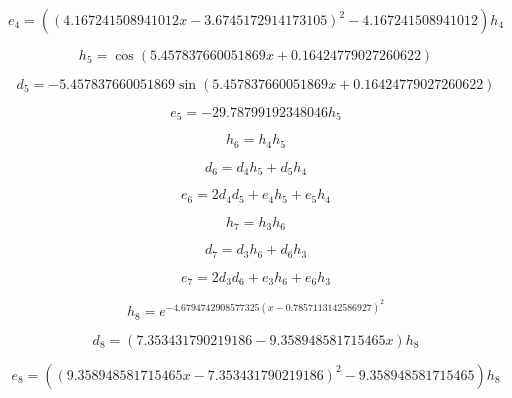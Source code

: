 \begin{equation}
e_{4}=\left(\left(4.167241508941012 x - 3.6745172914173105\right)^{2} - 4.167241508941012\right) h_{4}
\end{equation}


\begin{equation}
h_{5}=\cos{\left(5.457837660051869 x + 0.16424779027260622 \right)}
\end{equation}


\begin{equation}
d_{5}=- 5.457837660051869 \sin{\left(5.457837660051869 x + 0.16424779027260622 \right)}
\end{equation}


\begin{equation}
e_{5}=- 29.78799192348046 h_{5}
\end{equation}


\begin{equation}
h_{6}=h_{4} h_{5}
\end{equation}


\begin{equation}
d_{6}=d_{4} h_{5} + d_{5} h_{4}
\end{equation}


\begin{equation}
e_{6}=2 d_{4} d_{5} + e_{4} h_{5} + e_{5} h_{4}
\end{equation}


\begin{equation}
h_{7}=h_{3} h_{6}
\end{equation}


\begin{equation}
d_{7}=d_{3} h_{6} + d_{6} h_{3}
\end{equation}


\begin{equation}
e_{7}=2 d_{3} d_{6} + e_{3} h_{6} + e_{6} h_{3}
\end{equation}


\begin{equation}
h_{8}=e^{- 4.6794742908577325 \left(x - 0.7857113142586927\right)^{2}}
\end{equation}


\begin{equation}
d_{8}=\left(7.353431790219186 - 9.358948581715465 x\right) h_{8}
\end{equation}


\begin{equation}
e_{8}=\left(\left(9.358948581715465 x - 7.353431790219186\right)^{2} - 9.358948581715465\right) h_{8}
\end{equation}


